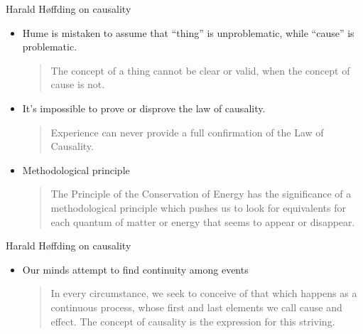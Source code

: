 \documentclass[fleqn]{beamer}
\begin{document}
\begin{frame}{Harald Høffding on causality}

  \begin{itemize}
  \item Hume is mistaken to assume that ``thing'' is unproblematic,
    while ``cause'' is problematic.

     \medskip \begin{quote} The concept of a thing cannot be clear or
       valid, when the concept of cause is not. \citep[p
       238]{hoff} \end{quote}
   \item It's impossible to prove or disprove the law of causality.

     \medskip \begin{quote} Experience can never provide a full
       confirmation of the Law of Causality. \citep[p
       241]{hoff} \end{quote}
  \item Methodological principle

    \medskip \begin{quote} The Principle of the Conservation of Energy
      has the significance of a methodological principle which pushes
      us to look for equivalents for each quantum of matter or energy
      that seems to appear or disappear. \citep[p
      36]{hoff} \end{quote}
    
  \end{itemize}

  

\end{frame}

\begin{frame}{Harald Høffding on causality}

  \begin{itemize} \item Our minds attempt to find continuity among
    events

    \medskip \begin{quote} In every circumstance, we seek to conceive
      of that which happens as a continuous process, whose first and
      last elements we call cause and effect. The concept of causality
      is the expression for this striving. \citep[p
      240]{hoff} \end{quote} \end{itemize}



\end{frame}
\end{document}
